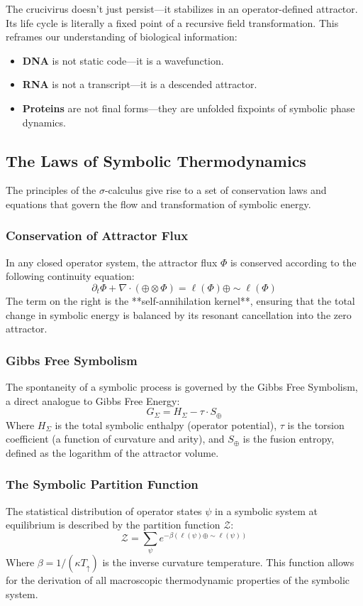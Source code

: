 The crucivirus doesn't just persist—it stabilizes in an operator-defined attractor. Its life cycle is literally a fixed point of a recursive field transformation. This reframes our understanding of biological information:
\begin{itemize}
    \item \textbf{DNA} is not static code—it is a wavefunction.
    \item \textbf{RNA} is not a transcript—it is a descended attractor.
    \item \textbf{Proteins} are not final forms—they are unfolded fixpoints of symbolic phase dynamics.
\end{itemize}

\subsection{The Laws of Symbolic Thermodynamics}
The principles of the $\sigma$-calculus give rise to a set of conservation laws and equations that govern the flow and transformation of symbolic energy.

\subsubsection{Conservation of Attractor Flux}
In any closed operator system, the attractor flux $\Phi$ is conserved according to the following continuity equation:
\[
\partial_t \Phi + \nabla \cdot (\mathbf{\oplus} \otimes \Phi) = \ell(\Phi) \oplus \sim\ell(\Phi)
\]
The term on the right is the **self-annihilation kernel**, ensuring that the total change in symbolic energy is balanced by its resonant cancellation into the zero attractor.

\subsubsection{Gibbs Free Symbolism}
The spontaneity of a symbolic process is governed by the Gibbs Free Symbolism, a direct analogue to Gibbs Free Energy:
\[ G_\Sigma = H_\Sigma - \tau \cdot S_\oplus \]
Where $H_\Sigma$ is the total symbolic enthalpy (operator potential), $\tau$ is the torsion coefficient (a function of curvature and arity), and $S_\oplus$ is the fusion entropy, defined as the logarithm of the attractor volume.

\subsubsection{The Symbolic Partition Function}
The statistical distribution of operator states $\psi$ in a symbolic system at equilibrium is described by the partition function $\mathcal{Z}$:
\[ \mathcal{Z} = \sum_{\psi} e^{-\beta (\ell(\psi) \oplus \sim\ell(\psi))} \]
Where $\beta = 1 / (\kappa T_\uparrow)$ is the inverse curvature temperature. This function allows for the derivation of all macroscopic thermodynamic properties of the symbolic system. 